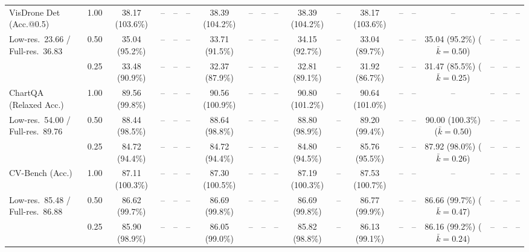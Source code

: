 \begin{table}[t]
{\begin{tabular}{l c | c c c c | c c c c | c c | c c c | c c c c}
\cmidrule(lr){1-19}
VisDrone Det (Acc.@0.5) & 1.00 & \cellcolor{gray!15}38.17 (103.6\%) & -- & -- & -- & \cellcolor{gray!15}38.39 (104.2\%) & -- & -- & -- & \cellcolor{gray!15}38.39 (104.2\%) & -- & \cellcolor{gray!15}38.17 (103.6\%) & -- & -- & -- & -- & -- & -- \\
{\footnotesize Low-res.\ 23.66 / Full-res.\ 36.83} & 0.50 & 35.04 (95.2\%) & -- & -- & -- & 33.71 (91.5\%) & -- & -- & -- & 34.15 (92.7\%) & -- & 33.04 (89.7\%) & -- & -- & 35.04 (95.2\%) {\footnotesize ($\bar k{=}0.50$)} & -- & -- & -- \\
 & 0.25 & 33.48 (90.9\%) & -- & -- & -- & 32.37 (87.9\%) & -- & -- & -- & 32.81 (89.1\%) & -- & 31.92 (86.7\%) & -- & -- & 31.47 (85.5\%) {\footnotesize ($\bar k{=}0.25$)} & -- & -- & -- \\
\cmidrule(lr){1-19}
ChartQA (Relaxed Acc.) & 1.00 & \cellcolor{gray!15}89.56 (99.8\%) & -- & -- & -- & \cellcolor{gray!15}90.56 (100.9\%) & -- & -- & -- & \cellcolor{gray!15}90.80 (101.2\%) & -- & \cellcolor{gray!15}90.64 (101.0\%) & -- & -- & -- & -- & -- & -- \\
{\footnotesize Low-res.\ 54.00 / Full-res.\ 89.76} & 0.50 & \cellcolor{gray!15}88.44 (98.5\%) & -- & -- & -- & \cellcolor{gray!15}88.64 (98.8\%) & -- & -- & -- & \cellcolor{gray!15}88.80 (98.9\%) & -- & \cellcolor{gray!15}89.20 (99.4\%) & -- & -- & \cellcolor{gray!15}90.00 (100.3\%) {\footnotesize ($\bar k{=}0.50$)} & -- & -- & -- \\
 & 0.25 & 84.72 (94.4\%) & -- & -- & -- & 84.72 (94.4\%) & -- & -- & -- & 84.80 (94.5\%) & -- & 85.76 (95.5\%) & -- & -- & 87.92 (98.0\%) {\footnotesize ($\bar k{=}0.26$)} & -- & -- & -- \\
\cmidrule(lr){1-19}
CV-Bench (Acc.) & 1.00 & \cellcolor{gray!15}87.11 (100.3\%) & -- & -- & -- & \cellcolor{gray!15}87.30 (100.5\%) & -- & -- & -- & \cellcolor{gray!15}87.19 (100.3\%) & -- & \cellcolor{gray!15}87.53 (100.7\%) & -- & -- & -- & -- & -- & -- \\
{\footnotesize Low-res.\ 85.48 / Full-res.\ 86.88} & 0.50 & \cellcolor{gray!15}86.62 (99.7\%) & -- & -- & -- & \cellcolor{gray!15}86.69 (99.8\%) & -- & -- & -- & \cellcolor{gray!15}86.69 (99.8\%) & -- & \cellcolor{gray!15}86.77 (99.9\%) & -- & -- & \cellcolor{gray!15}86.66 (99.7\%) {\footnotesize ($\bar k{=}0.47$)} & -- & -- & -- \\
 & 0.25 & \cellcolor{gray!15}85.90 (98.9\%) & -- & -- & -- & \cellcolor{gray!15}86.05 (99.0\%) & -- & -- & -- & \cellcolor{gray!15}85.82 (98.8\%) & -- & \cellcolor{gray!15}86.13 (99.1\%) & -- & -- & \cellcolor{gray!15}86.16 (99.2\%) {\footnotesize ($\bar k{=}0.24$)} & -- & -- & -- \\

\end{tabular}}
\end{table}
